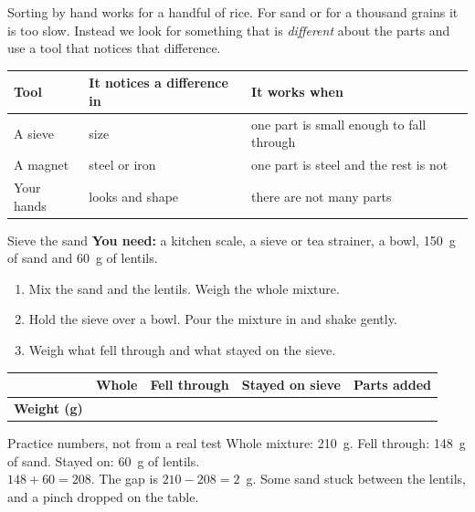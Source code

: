 \label{ch2}

Sorting by hand works for a handful of rice. For sand or for a thousand grains it is too slow. Instead we look for something that is \emph{different} about the parts and use a tool that notices that difference.

\begin{center}
\sffamily\small\renewcommand{\arraystretch}{1.5}
\begin{tabular}{@{}p{3.0cm}p{3.6cm}p{3.6cm}@{}}
\toprule
\textbf{Tool} & \textbf{It notices a difference in} & \textbf{It works when}\\
\midrule
A sieve & size & one part is small enough to fall through\\
A magnet & steel or iron & one part is steel and the rest is not\\
Your hands & looks and shape & there are not many parts\\
\bottomrule
\end{tabular}
\end{center}

\begin{tryit}{Sieve the sand}
\textbf{You need:} a kitchen scale, a sieve or tea strainer, a bowl, 150~g of sand and 60~g of lentils.
\begin{enumerate}[leftmargin=1.6em]
\item Mix the sand and the lentils. Weigh the whole mixture.
\item Hold the sieve over a bowl. Pour the mixture in and shake gently.
\item Weigh what fell through and what stayed on the sieve.
\end{enumerate}
\par\medskip
\renewcommand{\arraystretch}{1.6}
\begin{tabular}{|l|c|c|c|c|}
\hline
 & \textbf{Whole} & \textbf{Fell through} & \textbf{Stayed on sieve} & \textbf{Parts added}\\ \hline
\textbf{Weight (g)} & & & & \\ \hline
\end{tabular}
\end{tryit}

\begin{worked}{Practice numbers, not from a real test}
Whole mixture: 210~g. Fell through: 148~g of sand. Stayed on: 60~g of lentils.\\
$148+60=208$. The gap is $210-208=2$~g. Some sand stuck between the lentils, and a pinch dropped on the table.
\end{worked}

